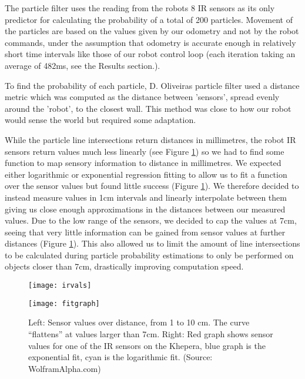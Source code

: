 \documentclass[paper=a4, fontsize=12pt]{scrartcl}	%
\numberwithin{equation}{section}		%
\numberwithin{figure}{section}			%
\numberwithin{table}{section}				%
\begin{document}
The particle filter uses the reading from the robots 8 IR sensors as its only predictor for calculating the probability of a total of 200 particles. Movement of the particles are based on the values given by our odometry and not by the robot commands, under the assumption that odometry is accurate enough in relatively short time intervals like those of our robot control loop (each iteration taking an average of 482ms, see the Results section.).

To find the probability of each particle, D. Oliveiras particle filter used a distance metric which was computed as the distance between 'sensors', spread evenly around the 'robot', to the closest wall. This method was close to how our robot would sense the world but required some adaptation. 

While the particle line intersections return distances in millimetres, the robot IR sensors return values much less linearly (see Figure \ref{irvalsfitgraph}) so we had to find some function to map sensory information to distance in millimetres. We expected either logarithmic or exponential regression fitting to allow us to fit a function over the sensor values but found little success (Figure \ref{irvalsfitgraph}). We therefore decided to instead measure values in 1cm intervals and linearly interpolate between them giving us close enough approximations in the distances between our measured values. Due to the low range of the sensors, we decided to cap the values at 7cm, seeing that very little information can be gained from sensor values at further distances (Figure \ref{irvalsfitgraph}). This also allowed us to limit the amount of line intersections to be calculated during particle probability estimations to only be performed on objects closer than 7cm, drastically improving computation speed.

\begin{figure}[ht]
  \begin{minipage}[b]{0.45\linewidth}
    \centering
    \texttt{[image: irvals]}
  \end{minipage}
  \hspace{0.5cm}
  \begin{minipage}[b]{0.45\linewidth}
    \centering
    \texttt{[image: fitgraph]}
  \end{minipage}
  \label{irvalsfitgraph}
  \caption{Left: Sensor values over distance, from 1 to 10 cm. The curve ``flattens'' at values larger than 7cm. Right: Red graph shows sensor values for one of the IR sensors on the Khepera, blue graph is the exponential fit, cyan is the logarithmic fit. (Source: WolframAlpha.com)}
\end{figure}
\end{document}
